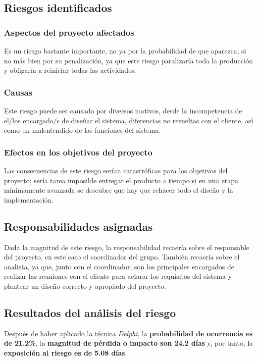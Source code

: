 \documentclass[11pt,a4paper,spanish,twoside]{book}
\begin{document}
\subsection{Riesgos identificados}
\subsubsection{Aspectos del proyecto afectados}
Es un riesgo bastante importante, no ya por la probabilidad de que aparezca,
si no más bien por su penalización, ya que este riesgo paralizaría toda la
producción y obligaría a reiniciar todas las actividades.

\subsubsection{Causas}
Este riesgo puede ser causado por diversos motivos, desde la incompetencia de
el/los encargado/s de diseñar el sistema, diferencias no resueltas con el
cliente, así como un malentendido de las funciones del sistema.

\subsubsection{Efectos en los objetivos del proyecto}
Las consecuencias de este riesgo serían catastróficas para los objetivos del
proyecto; sería tarea imposible entregar el producto a tiempo si en una etapa
mínimamente avanzada se descubre que hay que rehacer todo el diseño y la
implementación. 

\subsection{Responsabilidades asignadas}
Dada la magnitud de este riesgo, la responsabilidad recaería sobre el
responsable del proyecto, en este caso el coordinador del grupo. También
recaería sobre el analista, ya que, junto con el coordinador, son los
principales encargados de realizar las reuniones con el cliente para aclarar
los requisitos del sistema y plantear un diseño correcto y apropiado del
proyecto.

\subsection{Resultados del análisis del riesgo}
Después de haber aplicado la técnica \emph{Delphi}, la \textbf{probabilidad de
ocurrencia es de 21.2\%}, la \textbf{magnitud de pérdida o impacto son 24.2
días} y, por tanto, la \textbf{exposición al riesgo es de 5.08 días}.
\end{document}
